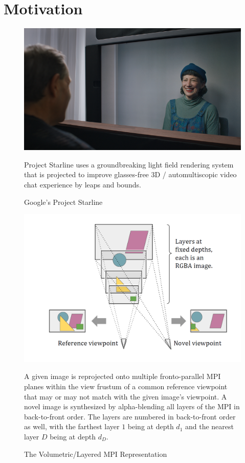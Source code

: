 \section{Motivation}\label{sec:motivation} 

\begin{figure}[!h]
    \includegraphics[width=1\columnwidth]{figures/google-starline-416.png}
    \caption{Google's Project Starline~\cite{bavor_project_2021}}
    \label{fig:google-starline}
    {\small Project Starline uses a groundbreaking light field rendering system that is projected to improve glasses-free 3D / automultiscopic video chat experience by leaps and bounds.}
\end{figure}

\begin{figure}[!h]
    \includegraphics[width=1\columnwidth]{figures/mpi-layered-representation.png}
    \caption{The Volumetric/Layered MPI Representation~\cite{zhou2018stereo}}
    \label{fig:mpi-layered-representation}
    {\small A given image is reprojected onto multiple fronto-parallel MPI planes within the view frustum of a common reference viewpoint that may or may not match with the given image's viewpoint. A novel image is synthesized by alpha-blending all layers of the MPI in back-to-front order. The layers are numbered in back-to-front order as well, with the farthest layer $1$ being at depth $d_1$ and the nearest layer $D$ being at depth $d_D$.}
\end{figure}

